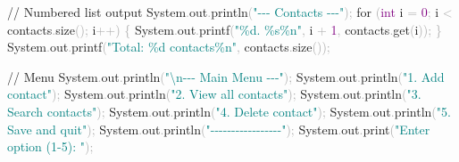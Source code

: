\documentclass[
  justified,
  openright,
]{tufte-book}
\newcommand{\BuiltInTok}[1]{#1}
\newcommand{\CommentTok}[1]{\textcolor{MidGray}{#1}}
\newcommand{\ControlFlowTok}[1]{\textcolor{BrandBlue}{#1}}
\newcommand{\DataTypeTok}[1]{\textcolor{Purple}{#1}}
\newcommand{\DecValTok}[1]{\textcolor{Purple}{#1}}
\newcommand{\FunctionTok}[1]{\textcolor{BrandBlue}{#1}}
\newcommand{\NormalTok}[1]{#1}
\newcommand{\OperatorTok}[1]{\textcolor{DarkGray}{#1}}
\newcommand{\SpecialCharTok}[1]{\textcolor{Teal}{#1}}
\newcommand{\StringTok}[1]{\textcolor{Teal}{#1}}
\newenvironment{Shaded}{%
  \begin{snugshade}
}{%
  \end{snugshade}
}
\begin{document}
\begin{Shaded}
\begin{Highlighting}[]
\CommentTok{// Numbered list output}
\BuiltInTok{System}\OperatorTok{.}\FunctionTok{out}\OperatorTok{.}\FunctionTok{println}\OperatorTok{(}\StringTok{"{-}{-}{-} Contacts {-}{-}{-}"}\OperatorTok{);}
\ControlFlowTok{for} \OperatorTok{(}\DataTypeTok{int}\NormalTok{ i }\OperatorTok{=} \DecValTok{0}\OperatorTok{;}\NormalTok{ i }\OperatorTok{\textless{}}\NormalTok{ contacts}\OperatorTok{.}\FunctionTok{size}\OperatorTok{();}\NormalTok{ i}\OperatorTok{++)} \OperatorTok{\{}
    \BuiltInTok{System}\OperatorTok{.}\FunctionTok{out}\OperatorTok{.}\FunctionTok{printf}\OperatorTok{(}\StringTok{"}\SpecialCharTok{\%d}\StringTok{. }\SpecialCharTok{\%s\%n}\StringTok{"}\OperatorTok{,}\NormalTok{ i }\OperatorTok{+} \DecValTok{1}\OperatorTok{,}\NormalTok{ contacts}\OperatorTok{.}\FunctionTok{get}\OperatorTok{(}\NormalTok{i}\OperatorTok{));}
\OperatorTok{\}}
\BuiltInTok{System}\OperatorTok{.}\FunctionTok{out}\OperatorTok{.}\FunctionTok{printf}\OperatorTok{(}\StringTok{"Total: }\SpecialCharTok{\%d}\StringTok{ contacts}\SpecialCharTok{\%n}\StringTok{"}\OperatorTok{,}\NormalTok{ contacts}\OperatorTok{.}\FunctionTok{size}\OperatorTok{());}

\CommentTok{// Menu}
\BuiltInTok{System}\OperatorTok{.}\FunctionTok{out}\OperatorTok{.}\FunctionTok{println}\OperatorTok{(}\StringTok{"}\SpecialCharTok{\textbackslash{}n}\StringTok{{-}{-}{-} Main Menu {-}{-}{-}"}\OperatorTok{);}
\BuiltInTok{System}\OperatorTok{.}\FunctionTok{out}\OperatorTok{.}\FunctionTok{println}\OperatorTok{(}\StringTok{"1. Add contact"}\OperatorTok{);}
\BuiltInTok{System}\OperatorTok{.}\FunctionTok{out}\OperatorTok{.}\FunctionTok{println}\OperatorTok{(}\StringTok{"2. View all contacts"}\OperatorTok{);}
\BuiltInTok{System}\OperatorTok{.}\FunctionTok{out}\OperatorTok{.}\FunctionTok{println}\OperatorTok{(}\StringTok{"3. Search contacts"}\OperatorTok{);}
\BuiltInTok{System}\OperatorTok{.}\FunctionTok{out}\OperatorTok{.}\FunctionTok{println}\OperatorTok{(}\StringTok{"4. Delete contact"}\OperatorTok{);}
\BuiltInTok{System}\OperatorTok{.}\FunctionTok{out}\OperatorTok{.}\FunctionTok{println}\OperatorTok{(}\StringTok{"5. Save and quit"}\OperatorTok{);}
\BuiltInTok{System}\OperatorTok{.}\FunctionTok{out}\OperatorTok{.}\FunctionTok{println}\OperatorTok{(}\StringTok{"{-}{-}{-}{-}{-}{-}{-}{-}{-}{-}{-}{-}{-}{-}{-}{-}{-}"}\OperatorTok{);}
\BuiltInTok{System}\OperatorTok{.}\FunctionTok{out}\OperatorTok{.}\FunctionTok{print}\OperatorTok{(}\StringTok{"Enter option (1{-}5): "}\OperatorTok{);}


\end{Highlighting}
\end{Shaded}
\end{document}
